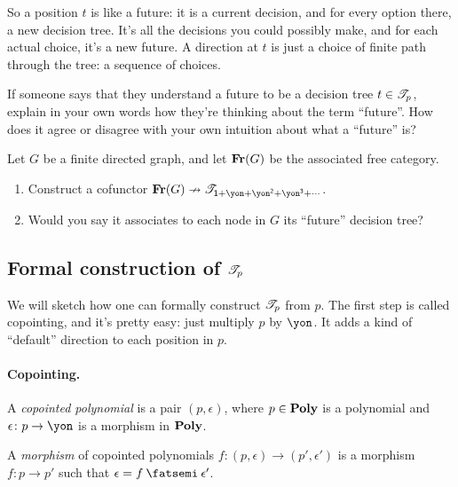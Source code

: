 \documentclass[Book-Poly]{subfiles}
\begin{document}
So a position $t$ is like a future: it is a current decision, and for every option there, a new decision tree. It's all the decisions you could possibly make, and for each actual choice, it's a new future. A direction at $t$ is just a choice of finite path through the tree: a sequence of choices. 

\begin{exercise}
If someone says that they understand a future to be a decision tree $t\in\mathscr{T}_{p}$, explain in your own words how they're thinking about the term ``future''. How does it agree or disagree with your own intuition about what a ``future'' is?
\end{exercise}

\begin{exercise}
Let $G$ be a finite directed graph, and let $\mathbf{Fr}(G)$ be the associated free category. 
\begin{enumerate}
	\item Construct a cofunctor $\Cat{Fr}(G)\cof\cofree{\1+\yon+\yon^\2+\yon^\3+\cdots}$.
	\item Would you say it associates to each node in $G$ its ``future'' decision tree?
\qedhere
\end{enumerate}
\end{exercise}

\subsection{Formal construction of $\mathscr{T}_{p}$}

We will sketch how one can formally construct $\mathscr{T}_{p}$ from $p$. The first step is called copointing, and it's pretty easy: just multiply $p$ by $\yon$. It adds a kind of ``default'' direction to each position in $p$.

\paragraph{Copointing.}

\begin{definition}
A \emph{copointed polynomial} is a pair $(p,\epsilon)$, where $p\in\mathbf{Poly}$ is a polynomial and $\epsilon\colon p\to\yon$ is a morphism in $\mathbf{Poly}$.

A \emph{morphism} of copointed polynomials $f\colon (p,\epsilon)\to(p',\epsilon')$ is a morphism $f\colon p\to p'$ such that $\epsilon=f\then\epsilon'$.
\end{definition}
\end{document}
